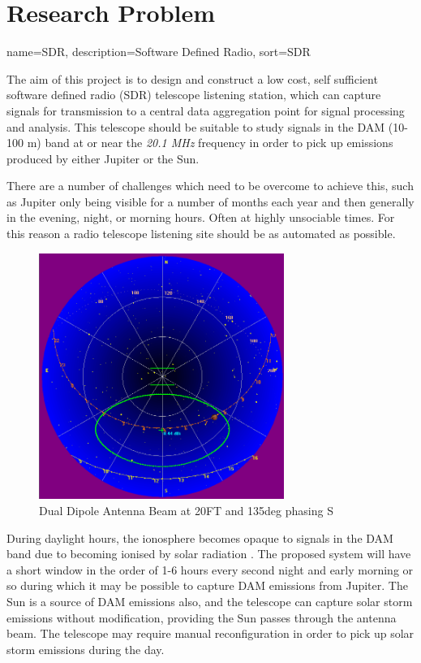 \documentclass[runningheads,a4paper]{llncs}
\begin{document}
\section*{Research Problem}
%
{
  name={SDR},
  description={Software Defined Radio},
  sort=SDR
}

The aim of this project is to design and construct a low cost, self sufficient software defined radio (\gls{SDR}) telescope listening station, which can capture signals for transmission to a central data aggregation point for signal processing and analysis. This telescope should be suitable to study signals  in the \gls{DAM} (10-100 m) band at or near the \textit{20.1 MHz} frequency in order to pick up emissions produced by either Jupiter or the Sun.

There are a number of challenges which need to be overcome to achieve this, such as Jupiter only being visible for a number of months each year and then generally in the evening, night, or morning hours. Often at highly unsociable times. For this reason a radio telescope listening site should be as automated as possible.

%
\begin{figure}[here]
\centering
\includegraphics[width=8cm]{images/07}
\caption{Dual Dipole Antenna Beam at 20FT and 135deg phasing S \citep{nasa12}}
\label{fig:dual_dipole_20ft_135phasing_s}
\end{figure}
%

During daylight hours, the ionosphere becomes opaque to signals in the \gls{DAM} band due to becoming ionised by solar radiation \citep{nasa-ionosphere-12}. The proposed system will have a short window in the order of 1-6 hours every second night and early morning or so during which it may be possible to capture \gls{DAM} emissions from Jupiter. The Sun is a source of \gls{DAM} emissions also, and the telescope can capture solar storm emissions without modification, providing the Sun passes through the antenna beam. The telescope may require manual reconfiguration in order to pick up solar storm emissions during the day.
\end{document}
